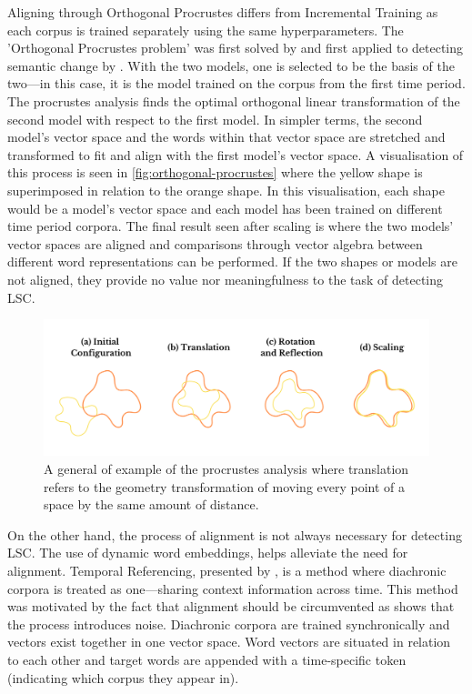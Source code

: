 Aligning through Orthogonal Procrustes differs from Incremental Training as each corpus is trained separately using the same hyperparameters. The 'Orthogonal Procrustes problem' was first solved by \citet{schonemann1966} and first applied to detecting semantic change by \citet{hamilton-etal-2016-diachronic}. With the two models, one is selected to be the basis of the two—in this case, it is the model trained on the corpus from the first time period. The procrustes analysis finds the optimal orthogonal linear transformation of the second model with respect to the first model. In simpler terms, the second model’s vector space and the words within that vector space are stretched and transformed to fit and align with the first model’s vector space. A visualisation of this process is seen in \autoref{fig:orthogonal-procrustes} where the yellow shape is superimposed in relation to the orange shape. In this visualisation, each shape would be a model's vector space and each model has been trained on different time period corpora. The final result seen after scaling is where the two models' vector spaces are aligned and comparisons through vector algebra between different word representations can be performed. If the two shapes or models are not aligned, they provide no value nor meaningfulness to the task of detecting LSC. 

\begin{figure}[h]
  \centering
  \includegraphics[width=1\linewidth]{sections/figures/orthogonal-procrustes.png}
  \caption{A general of example of the procrustes analysis where translation refers to the geometry transformation of moving every point of a space by the same amount of distance.}
  \label{fig:orthogonal-procrustes}
\end{figure}


On the other hand, the process of alignment is not always necessary for detecting LSC. The use of dynamic word embeddings, helps alleviate the need for alignment. Temporal Referencing, presented by \citet{dubossarsky-etal-2019-time}, is a method where diachronic corpora is treated as one—sharing context information across time. This method was motivated by the fact that alignment should be circumvented as \citet{dubossarsky-etal-2017-outta} shows that the process introduces noise.  Diachronic corpora are trained synchronically and vectors exist together in one vector space. Word vectors are situated in relation to each other and target words are appended with a time-specific token (indicating which corpus they appear in).